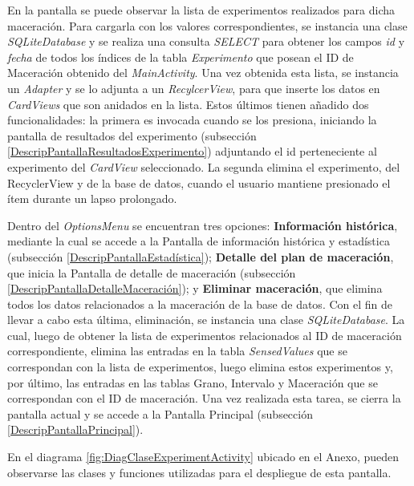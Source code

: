                \par En la pantalla se puede observar la lista de experimentos realizados para dicha maceración. Para cargarla con los valores correspondientes, se instancia una clase \textit{SQLiteDatabase} y se realiza una consulta \textit{SELECT} para obtener los campos \textit{id} y \textit{fecha} de todos los índices de la tabla \textit{Experimento} que posean el ID de Maceración obtenido del \textit{MainActivity}. Una vez obtenida esta lista, se instancia un \textit{Adapter} y se lo adjunta a un \textit{RecylcerView}, para que inserte los datos en \textit{CardViews} que son anidados en la lista. Estos últimos tienen añadido dos funcionalidades: la primera es invocada cuando se los presiona, iniciando la pantalla de resultados del experimento (subsección \ref{DescripPantallaResultadosExperimento}) adjuntando el id perteneciente al experimento del \textit{CardView} seleccionado. La segunda elimina el experimento, del RecyclerView y de la base de datos, cuando el usuario mantiene presionado el ítem durante un lapso prolongado.
                
                \par Dentro del \textit{OptionsMenu} se encuentran tres opciones: \textbf{Información histórica}, mediante la cual se accede a la Pantalla de información histórica y estadística (subsección \ref{DescripPantallaEstadística}); \textbf{Detalle del plan de maceración}, que inicia la Pantalla de detalle de maceración (subsección \ref{DescripPantallaDetalleMaceración}); y \textbf{ Eliminar maceración}, que elimina todos los datos relacionados a la maceración de la base de datos. Con el fin de llevar a cabo esta última, eliminación, se instancia una clase \textit{SQLiteDatabase}. La cual, luego de obtener la lista de experimentos relacionados al ID de maceración correspondiente, elimina las entradas en la tabla \textit{SensedValues} que se correspondan con la lista de experimentos, luego elimina estos experimentos y, por último, las entradas en las tablas Grano, Intervalo y Maceración que se correspondan con el ID de maceración. Una vez realizada esta tarea, se cierra la pantalla actual y se accede a la Pantalla Principal (subsección \ref{DescripPantallaPrincipal}).
                
                \par En el diagrama \ref{fig:DiagClaseExperimentActivity} ubicado en el Anexo, pueden observarse las clases y funciones utilizadas para el despliegue de esta pantalla.
            
